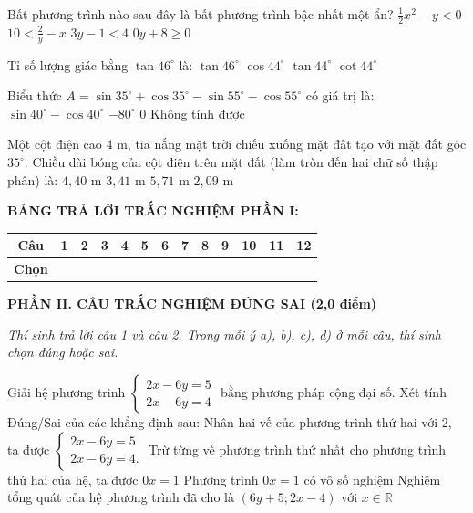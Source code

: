 \documentclass[12pt,a4paper]{article}
\begin{document}
\begin{ex}
Bất phương trình nào sau đây là bất phương trình bậc nhất một ẩn?
\choice
{$\frac{1}{2}x^2 - y < 0$}
{$10 < \frac{2}{y} - x$}
{\True $3y - 1 < 4$}
{$0y + 8 \ge 0$}
\end{ex}

\begin{ex}
Tỉ số lượng giác bằng $\tan 46^\circ$ là:
\choice
{$\tan 46^\circ$}
{$\cos 44^\circ$}
{$\tan 44^\circ$}
{\True $\cot 44^\circ$}
\end{ex}

\begin{ex}
Biểu thức $A = \sin 35^\circ + \cos 35^\circ - \sin 55^\circ - \cos 55^\circ$ có giá trị là:
\choice
{$\sin 40^\circ - \cos 40^\circ$}
{$-80^\circ$}
{\True $0$}
{Không tính được}
\end{ex}

\begin{ex}
Một cột điện cao $4\text{ m}$, tia nắng mặt trời chiếu xuống mặt đất tạo với mặt đất góc $35^\circ$. Chiều dài bóng của cột điện trên mặt đất (làm tròn đến hai chữ số thập phân) là:
\choice
{$4{,}40\text{ m}$}
{$3{,}41\text{ m}$}
{\True $5{,}71\text{ m}$}
{$2{,}09\text{ m}$}
\end{ex}


\vspace{1mm}
\noindent\textbf{BẢNG TRẢ LỜI TRẮC NGHIỆM PHẦN I:}
\begin{center}
\begin{tabular}{|c|c|c|c|c|c|c|c|c|c|c|c|c|}
\hline
\textbf{Câu} & \textbf{1} & \textbf{2} & \textbf{3} & \textbf{4} & \textbf{5} & \textbf{6} & \textbf{7} & \textbf{8} & \textbf{9} & \textbf{10} & \textbf{11} & \textbf{12} \\
\hline
\textbf{Chọn} & \rule{0pt}{0.65cm} & & & & & & & & & & & \\
\hline
\end{tabular}
\end{center}
\vspace{2mm}

\setcounter{ex}{0}
\noindent\textbf{\large PHẦN II. CÂU TRẮC NGHIỆM ĐÚNG SAI (2,0 điểm)}

\textit{Thí sinh trả lời câu 1 và câu 2. Trong mỗi ý a), b), c), d) ở mỗi câu, thí sinh chọn đúng hoặc sai.}

\vspace{1mm}
\begin{ex}
Giải hệ phương trình $\begin{cases} 2x - 6y = 5 \\ 2x - 6y = 4 \end{cases}$ bằng phương pháp cộng đại số. Xét tính Đúng/Sai của các khẳng định sau:
\choiceTF
{Nhân hai vế của phương trình thứ hai với 2, ta được $\begin{cases} 2x - 6y = 5 \\ 2x - 6y = 4. \end{cases}$}
{\True Trừ từng vế phương trình thứ nhất cho phương trình thứ hai của hệ, ta được $0x = 1$}
{Phương trình $0x = 1$ có vô số nghiệm}
{Nghiệm tổng quát của hệ phương trình đã cho là $(6y + 5; 2x - 4)$ với $x \in \mathbb{R}$}
\end{ex}
\end{document}
